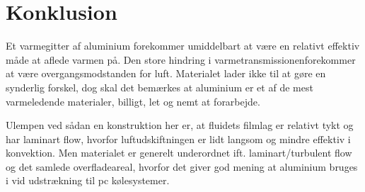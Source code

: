 \section{Konklusion}

Et varmegitter af aluminium forekommer umiddelbart at være en relativt effektiv måde at aflede varmen på. 
Den store hindring i varmetransmissionenforekommer at være overgangsmodstanden for luft. 
Materialet lader ikke til at gøre en synderlig forskel, dog skal det bemærkes at aluminium er et af de mest varmeledende materialer, billigt, let og nemt at forarbejde.

Ulempen ved sådan en konstruktion her er, at fluidets filmlag er relativt tykt og har laminart flow, hvorfor luftudskiftningen er lidt langsom og mindre effektiv i konvektion. 
Men materialet er generelt underordnet ift. laminart/turbulent flow og det samlede overfladeareal, hvorfor det giver god mening at aluminium bruges i vid udstrækning til pc kølesystemer. 